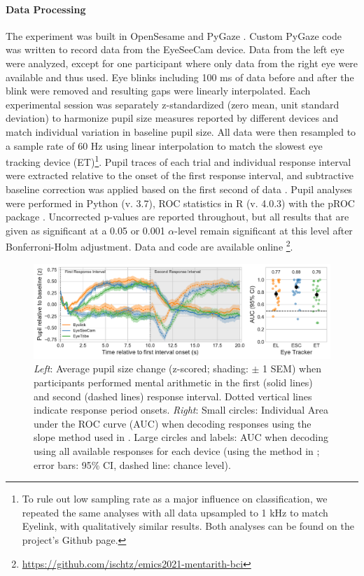 \documentclass[manuscript]{acmart}
\begin{document}
\paragraph{Data Processing} The experiment was built in OpenSesame \cite{Mathot2012} and PyGaze \cite{Dalmaijer2014}. Custom PyGaze code was written to record data from the EyeSeeCam device.  Data from the left eye were analyzed, except for one participant where only data from the right eye were available and thus used. Eye blinks including 100 ms of data before and after the blink were removed and resulting gaps were linearly interpolated. Each experimental session was separately z-standardized (zero mean, unit standard deviation) to harmonize pupil size measures reported by different devices and match individual variation in baseline pupil size. All data were then resampled to a sample rate of 60 Hz using linear interpolation to match the slowest eye tracking device (ET)\footnote{To rule out low sampling rate as a major influence on classification, we repeated the same analyses with all data upsampled to 1 kHz to match Eyelink, with qualitatively similar results. Both analyses can be found on the project's Github page.}. Pupil traces of each trial and individual response interval were extracted relative to the onset of the first response interval, and subtractive baseline correction was applied based on the first second of data \cite{Mathot2018}. Pupil analyses were performed in Python (v. 3.7), ROC statistics in R (v. 4.0.3) with the pROC package \cite{Robin2011}. Uncorrected p-values are reported throughout, but all results that are given as significant at a 0.05 or 0.001 $\alpha$-level remain significant at this level after Bonferroni-Holm adjustment. Data and code are available online \footnote{\url{https://github.com/ischtz/emics2021-mentarith-bci}}.

\begin{figure}
    \centering
    \includegraphics[width=1\textwidth]{figure1.pdf}
    \caption{\textit{Left}: Average pupil size change (z-scored; shading: $\pm$ 1 SEM) when participants performed mental arithmetic in the first (solid lines) and second (dashed lines) response interval. Dotted vertical lines indicate response period onsets. \textit{Right}: Small circles: Individual Area under the ROC curve (AUC) when decoding responses using the slope method used in \cite{Stoll2013}. Large circles and labels: AUC when decoding using all available responses for each device (using the method in \cite{Stoll2013}; error bars: 95\% CI, dashed line: chance level).}
    \label{fig:pupil}
\end{figure}
\end{document}

